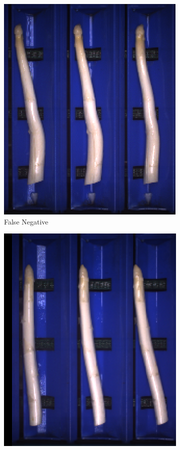 \begin{figure}[h]
	\centering
	\begin{subfigure}{0.3\textwidth}
		\includegraphics[width=0.9\linewidth]{Figures/appendix/verythin_falsenegative_01.png}
		\vspace{-5pt} 
		\caption{False Negative}
	\end{subfigure}
	\begin{subfigure}{0.3\textwidth}
		\includegraphics[width=0.9\linewidth]{Figures/appendix/verythin_falsenegative_02.png}

\end{subfigure}
\end{figure}
